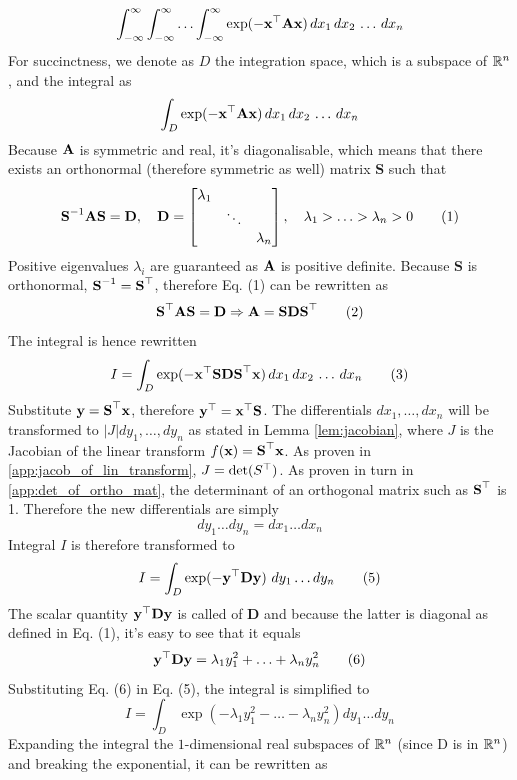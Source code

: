 \documentclass[a4paper]{article}
\begin{document}
\begin{equation*}
	\int_{-\infty}^\infty \int_{-\infty}^\infty \ldots \int_{-\infty}^\infty \exp(-\textbf{x}^{\top} \textbf{A} \textbf{x}) \,dx_1\,dx_2\,\ldots\, dx_n
\end{equation*}
For succinctness, we denote as $D$ the integration space, which is a subspace of $\mathbb{R}^n$, and the integral as
\[
	\int_D \exp(-\textbf{x}^{\top} \textbf{A} \textbf{x}) \,dx_1\,dx_2\,\ldots\, dx_n
\]
Because $\textbf{A}$ is symmetric and real, it's diagonalisable, which means that there exists an orthonormal (therefore symmetric as well) matrix $\textbf{S}$ such that
\[
	\textbf{S}^{-1}\textbf{A} \textbf{S}	=\textbf{D} , \quad 
	\textbf{D} = \begin{bmatrix}
	\lambda_1 & &	\\
		& \ddots & \\
	 & & \lambda_n
	\end{bmatrix},\quad
	\lambda_1 > \ldots > \lambda_n > 0
	\tag{1}
\]
Positive eigenvalues $\lambda_i$ are guaranteed as $\textbf{A}$ is positive definite. Because $\textbf{S}$ is orthonormal, $\textbf{S}^{-1}= \textbf{S}^{\top}$, therefore Eq. (1) can be rewritten as
\[
	\textbf{S}^{\top}\textbf{A} \textbf{S}	=\textbf{D} \Rightarrow \textbf{A} = \textbf{S} \textbf{D} \textbf{S}^{\top}
	\tag{2}
\]
The integral is hence rewritten
\[
	I = \int_D \exp(-\textbf{x}^{\top} \textbf{S}\textbf{DS}^{\top} \textbf{x}) \,dx_1\,dx_2\,\ldots\, dx_n
	\tag{3}
\]
Substitute $\textbf{y}=\textbf{S}^{\top}\textbf{x}$, therefore $\textbf{y}^{\top} = \textbf{x}^{\top}\textbf{S}$. The differentials $dx_1,\ldots,dx_n$ will be transformed to $\left| J \right| dy_1,\ldots, dy_n$ as stated in Lemma \ref{lem:jacobian}, where $J$ is the Jacobian of the linear transform $f(\textbf{x}) = \textbf{S}^{\top} \textbf{x}$. As proven in \ref{app:jacob_of_lin_transform}, $J = \det(S^{\top})$. As proven in turn in \ref{app:det_of_ortho_mat}, the determinant of an orthogonal matrix such as $\textbf{S}^{\top}$ is 1. Therefore the new differentials are simply
\[
	dy_1\ldots dy_n = dx_1\ldots dx_n 	
	\tag{4}
\]
Integral $I$ is therefore transformed to
\[
	I = \int_D \exp(-\textbf{y}^{\top}\textbf{D}\textbf{y}) \ dy_1\ldots dy_n
	\tag{5}
\]
The scalar quantity $\textbf{y}^{\top} \textbf{D} \textbf{y}$ is called  of $\textbf{D}$ and because the latter is diagonal as defined in Eq. (1), it's easy to see that it equals
\[
	\textbf{y}^{\top} \textbf{D} \textbf{y} = \lambda_1y_1^2 + \ldots +  \lambda_n y_n^2
	\tag{6}
\]
Substituting Eq. (6) in Eq. (5), the integral is simplified to
\[
	I = \int_D \exp(-\lambda_1y_1^2 - \ldots -\lambda_ny_n^2) dy_1\ldots dy_n
	\tag{7}	
\]
Expanding the integral the $1$-dimensional real subspaces of $\mathbb{R}^n$ (since D is in $\mathbb{R}^n$) and breaking the exponential, it can be rewritten as
\end{document}
